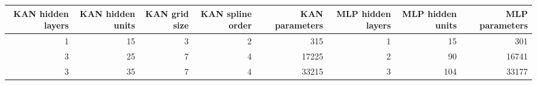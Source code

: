 \begin{tabular}{rrrrrrrr}
\toprule
KAN hidden layers & KAN hidden units & KAN grid size & KAN spline order & KAN parameters & MLP hidden layers & MLP hidden units & MLP parameters \\
\midrule
1 & 15 & 3 & 2 & 315 & 1 & 15 & 301 \\
3 & 25 & 7 & 4 & 17225 & 2 & 90 & 16741 \\
3 & 35 & 7 & 4 & 33215 & 3 & 104 & 33177 \\
\bottomrule
\end{tabular}
